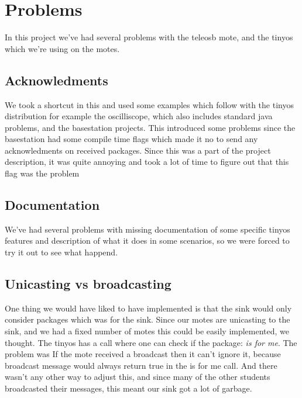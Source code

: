 \section{Problems}
In this project we've had several problems with the teleosb mote, and the tinyos which we're using on the motes. 
\subsection{Acknowledments}
We took a shortcut in this and used some examples which follow with the tinyos distribution for example the oscilliscope, which also includes standard java problems,  and the basestation projects. This introduced some problems since the basestation had some compile time flags which made it no to send any acknowledments on received packages. Since this was a part of the project description, it was quite annoying and took a lot of time to figure out that this flag was the problem 
\subsection{Documentation}
We've had several problems with missing documentation of some specific tinyos features and description of what it does in some scenarios, so we were forced to try it out to see what happend. 
\subsection{Unicasting vs broadcasting}
One thing we would have liked to have implemented is that the sink would only consider packages which was for the sink. Since our motes are unicasting to the sink, and we had a fixed number of motes this could be easily implemented, we thought. The tinyos has a call where one can check if the package: \emph{is for me}. The problem was If the mote received a broadcast then it can't ignore it, because broadcast message would always return true in the is for me call. And there wasn't any other way to adjust this, and since many of the other students broadcasted their messages, this meant our sink got a lot of garbage.

